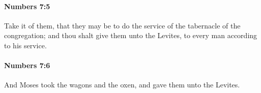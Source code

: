 		\paragraph{Numbers 7:5} %
			\label{NUMBERS-7-5}

			Take it of them, that they may be to do the service of the tabernacle of the congregation; and thou shalt give them unto the Levites, to every man according to his service.


		\paragraph{Numbers 7:6} %
			\label{NUMBERS-7-6}

			And Moses took the wagons and the oxen, and gave them unto the Levites.


